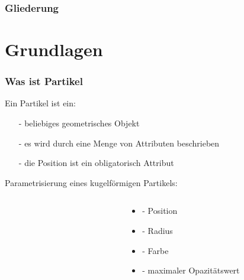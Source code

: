 \documentclass[xcolor=dvipsnames]{beamer}
\begin{document}
\begin{frame}
	\frametitle{Gliederung}
	\tableofcontents
\end{frame}

\section{\textbullet \hspace{0.2cm} Grundlagen}
\begin{frame}
	\frametitle{Was ist Partikel}
	
	Ein Partikel ist ein: \\
	\vspace{0.2cm}
	
	\begin{itemize}
		\item[-] beliebiges geometrisches Objekt
		\item[-] es wird durch eine Menge von Attributen beschrieben
		\item[-] die Position ist ein obligatorisch Attribut
	\end{itemize}

	\vspace{0.5cm}
	Parametrisierung eines kugelförmigen Partikels:
	
	\begin{columns}
		\begin{column}{3cm}
			\begin{figure}
				\def\svgwidth{3cm}
				
			\end{figure}
		\end{column}
		\begin{column}{7cm}
			\begin{itemize}
				\setlength{\itemsep}{8pt}
				\item {} - Position
				\item {} - Radius
				\item {} - Farbe
				\item {} - maximaler Opazitätswert
			\end{itemize}
		\end{column}
	\end{columns}
	
	
\end{frame}
\end{document}
